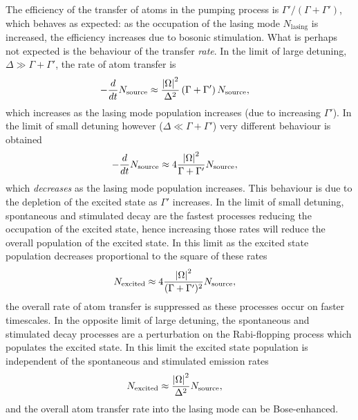 The efficiency of the transfer of atoms in the pumping process is $\Gamma'/(\Gamma + \Gamma')$, which behaves as expected: as the occupation of the lasing mode $N_\text{lasing}$ is increased, the efficiency increases due to bosonic stimulation.  What is perhaps not expected is the behaviour of the transfer \emph{rate}.  In the limit of large detuning, $\Delta \gg \Gamma + \Gamma'$, the rate of atom transfer is
\begin{align}
    -\frac{d}{dt} N_\text{source} &\approx \frac{\left|\Omega\right|^2}{\Delta^2} \left(\Gamma + \Gamma'\right) N_\text{source},
\end{align}
which increases as the lasing mode population increases (due to increasing $\Gamma'$).  In the limit of small detuning however ($\Delta \ll \Gamma + \Gamma'$) very different behaviour is obtained
\begin{align}
    -\frac{d}{dt} N_\text{source} &\approx 4 \frac{\abs{\Omega}^2}{\Gamma + \Gamma'} N_\text{source}, \label{OpticalPumping:SingleModePumpingRateZeroDetuning}
\end{align}
which \emph{decreases} as the lasing mode population increases.  This behaviour is due to the depletion of the excited state as $\Gamma'$ increases.  In the limit of small detuning, spontaneous and stimulated decay are the fastest processes reducing the occupation of the excited state, hence increasing those rates will reduce the overall population of the excited state.  In this limit as the excited state population decreases proportional to the square of these rates
\begin{align}
    N_\text{excited} &\approx 4 \frac{\left|\Omega\right|^2}{(\Gamma + \Gamma')^2} N_\text{source},
\end{align}
the overall rate of atom transfer is suppressed as these processes occur on faster timescales.  In the opposite limit of large detuning, the spontaneous and stimulated decay processes are a perturbation on the Rabi-flopping process which populates the excited state.  In this limit the excited state population is independent of the spontaneous and stimulated emission rates
\begin{align}
    N_\text{excited} &\approx \frac{\left|\Omega\right|^2}{\Delta^2} N_\text{source},
\end{align}
and the overall atom transfer rate into the lasing mode can be Bose-enhanced.

\parasep

